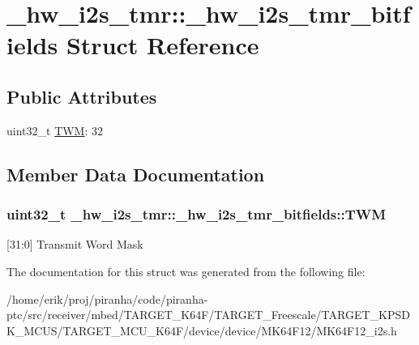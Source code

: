 \hypertarget{struct__hw__i2s__tmr_1_1__hw__i2s__tmr__bitfields}{}\section{\+\_\+hw\+\_\+i2s\+\_\+tmr\+:\+:\+\_\+hw\+\_\+i2s\+\_\+tmr\+\_\+bitfields Struct Reference}
\label{struct__hw__i2s__tmr_1_1__hw__i2s__tmr__bitfields}
\subsection*{Public Attributes}
\begin{DoxyCompactItemize}
\item 
uint32\+\_\+t \hyperlink{struct__hw__i2s__tmr_1_1__hw__i2s__tmr__bitfields_af692717c31a183e66acb93fb70f70dcc}{T\+WM}\+: 32
\end{DoxyCompactItemize}


\subsection{Member Data Documentation}
\subsubsection[{\texorpdfstring{T\+WM}{TWM}}]{\setlength{\rightskip}{0pt plus 5cm}uint32\+\_\+t \+\_\+hw\+\_\+i2s\+\_\+tmr\+::\+\_\+hw\+\_\+i2s\+\_\+tmr\+\_\+bitfields\+::\+T\+WM}\hypertarget{struct__hw__i2s__tmr_1_1__hw__i2s__tmr__bitfields_af692717c31a183e66acb93fb70f70dcc}{}\label{struct__hw__i2s__tmr_1_1__hw__i2s__tmr__bitfields_af692717c31a183e66acb93fb70f70dcc}
\mbox{[}31\+:0\mbox{]} Transmit Word Mask 

The documentation for this struct was generated from the following file\+:\begin{DoxyCompactItemize}
\item 
/home/erik/proj/piranha/code/piranha-\/ptc/src/receiver/mbed/\+T\+A\+R\+G\+E\+T\+\_\+\+K64\+F/\+T\+A\+R\+G\+E\+T\+\_\+\+Freescale/\+T\+A\+R\+G\+E\+T\+\_\+\+K\+P\+S\+D\+K\+\_\+\+M\+C\+U\+S/\+T\+A\+R\+G\+E\+T\+\_\+\+M\+C\+U\+\_\+\+K64\+F/device/device/\+M\+K64\+F12/M\+K64\+F12\+\_\+i2s.\+h\end{DoxyCompactItemize}
